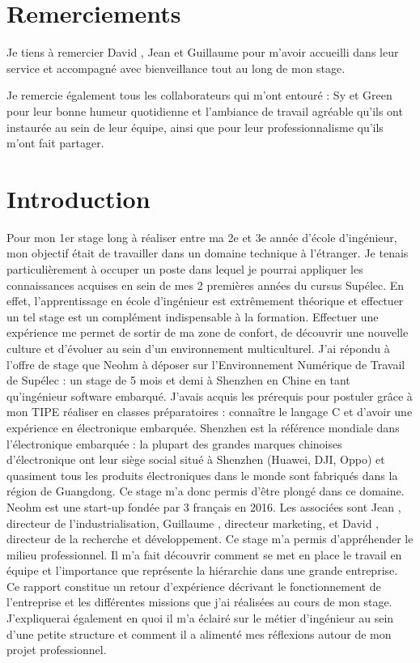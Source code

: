 \documentclass[a4paper, 11pt]{report}
\begin{document}
\tableofcontents

\chapter*{Remerciements}

Je tiens à remercier David , Jean  et Guillaume  pour m’avoir accueilli dans leur service et accompagné avec bienveillance tout au long de mon stage.

Je remercie également tous les collaborateurs qui m’ont entouré : Sy et Green pour leur bonne humeur quotidienne et l’ambiance de travail agréable qu’ils ont instaurée au sein de leur équipe, ainsi que pour leur professionnalisme qu’ils m’ont fait partager.

\chapter{Introduction}
Pour mon 1er stage long à réaliser entre ma 2e et 3e année d’école d’ingénieur, mon objectif était de travailler dans un domaine technique à l’étranger. Je tenais particulièrement à occuper un poste dans lequel je pourrai appliquer les connaissances acquises en sein de mes 2 premières années du cursus Supélec. En effet, l’apprentissage en école d’ingénieur est extrêmement théorique et effectuer un tel stage est un complément indispensable à la formation. Effectuer une expérience me permet de sortir de ma zone de confort, de découvrir une nouvelle culture et d’évoluer au sein d’un environnement multiculturel. 
J’ai répondu à l’offre de stage que Neohm à déposer sur l’Environnement Numérique de Travail de Supélec : un stage de 5 mois et demi à Shenzhen en Chine en tant qu’ingénieur software embarqué. J’avais acquis les prérequis pour postuler grâce à mon TIPE réaliser en classes préparatoires : connaître le langage C et d’avoir une expérience en électronique embarquée.
Shenzhen est la référence mondiale dans l’électronique embarquée : la plupart des grandes marques chinoises d’électronique ont leur siège social situé à Shenzhen (Huawei, DJI, Oppo) et quasiment tous les produits électroniques dans le monde sont fabriqués dans la région de Guangdong. Ce stage m’a donc permis d’être plongé dans ce domaine.
Neohm est une start-up fondée par 3 français en 2016. Les associées sont Jean , directeur de l’industrialisation, Guillaume , directeur marketing, et David , directeur de la recherche et développement. 
Ce stage m’a permis d’appréhender le milieu professionnel. Il m’a fait découvrir comment se met en place le travail en équipe et l’importance que représente la hiérarchie dans une grande entreprise.
Ce rapport constitue un retour d’expérience décrivant le fonctionnement de l’entreprise et les différentes missions que j’ai réalisées au cours de mon stage. J’expliquerai également en quoi il m’a éclairé sur le métier d’ingénieur au sein d’une petite structure et comment il a alimenté mes réflexions autour de mon projet professionnel.
\end{document}

